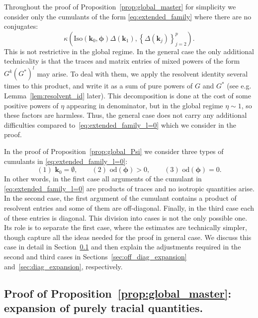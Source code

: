 \documentclass[10pt]{amsart}
\numberwithin{equation}{section}
\begin{document}
Throughout the proof of Proposition~\ref{prop:global_master}  for simplicity we consider  only the cumulants of the form \eqref{eq:extended_family} where there are no conjugates:
\begin{equation}
\kappa\left(\mathrm{Iso}(\bm{k}_0,\bm{\phi})\Delta(\bm{k}_1), \left\lbrace \Delta(\bm{k}_j)\right\rbrace_{j=2}^p\right).
\label{eq:extended_family_l=0}
\end{equation}
This is not restrictive in the global regime. In the general case the only additional technicality is that the traces and matrix entries of mixed powers of the form $G^k(G^*)^l$ may arise. To deal with them, we apply the resolvent identity several times to this product, and write it as a sum of pure powers of $G$ and $G^*$ (see e.g. Lemma~\ref{lem:resolvent_id} later). This decomposition is done at the cost of some positive powers of $\eta$ appearing in denominator, but in the global regime $\eta\sim 1$, so these factors are harmless. Thus, the general case does not carry any additional difficulties compared to~\eqref{eq:extended_family_l=0} which we consider in the proof.    


In the proof of Proposition~\ref{prop:global_Psi} we consider three types of cumulants in \eqref{eq:extended_family_l=0}:
\begin{equation}
(1)\,\, \bm{k}_0=\emptyset,\qquad (2)\,\, \mathrm{od}(\bm{\phi})>0,\qquad (3)\,\, \mathrm{od}(\bm{\phi})=0.
\end{equation}
In other words, in the first case all arguments of the cumulant in \eqref{eq:extended_family_l=0} are products of traces and no isotropic quantities arise. In the second case, the first argument of the cumulant contains a product of resolvent entries and some of them are off-diagonal. Finally, in the third case each of these entries is diagonal. This division into cases is not the only possible one. Its role  is to separate the first case, where the estimates are technically simpler, though capture all the ideas needed for the proof in general case. We discuss this case in detail in Section~\ref{sec:tracial_expansion} and then explain the adjustments required in the second and third cases in Sections~\ref{sec:off_diag_expansion} and~\ref{sec:diag_expansion}, respectively.

\subsection{Proof of Proposition~\ref{prop:global_master}: expansion of purely tracial quantities.}\label{sec:tracial_expansion}
\end{document}
